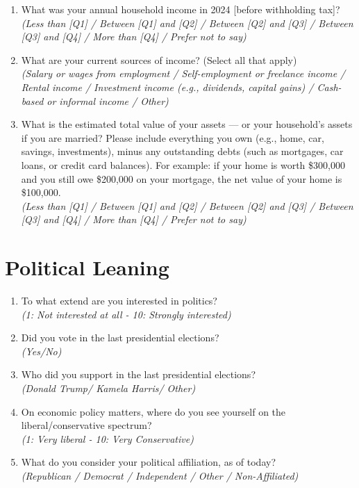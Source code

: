 \documentclass[11pt]{article}
\begin{document}
\begin{enumerate}
    \item What was your annual household income in 2024 [before withholding tax]?\\ 
    \textit{(Less than [Q1] / Between [Q1] and [Q2] / Between [Q2] and [Q3] / Between [Q3] and [Q4] / More than [Q4] / Prefer not to say)}
    \item What are your current sources of income? (Select all that apply)\\
    \textit{(Salary or wages from employment / Self-employment or freelance income / Rental income / Investment income (e.g., dividends, capital gains) / Cash-based or informal income / Other)}
    \item What is the estimated total value of your assets — or your household’s assets if you are married? Please include everything you own (e.g., home, car, savings, investments), minus any outstanding debts (such as mortgages, car loans, or credit card balances). For example: if your home is worth \$300,000 and you still owe \$200,000 on your mortgage, the net value of your home is \$100,000.\\
    \textit{(Less than [Q1] / Between [Q1] and [Q2] / Between [Q2] and [Q3] / Between [Q3] and [Q4] / More than [Q4] / Prefer not to say)}
\end{enumerate}
\section*{Political Leaning}
\begin{enumerate}[resume]
    \item To what extend are you interested in politics?\\ \textit{(1: Not interested at all - 10: Strongly interested)}
    \item Did you vote in the last presidential elections? \\\textit{(Yes/No)}
    \item Who did you support in the last presidential elections? \\ \textit{(Donald Trump/ Kamela Harris/ Other)}
    \item On economic policy matters, where do you see yourself on the liberal/conservative spectrum? \\\textit{(1: Very liberal - 10: Very Conservative)}
    \item What do you consider your political affiliation, as of today? \\
    \textit{(Republican / Democrat / Independent / Other / Non-Affiliated)}
\end{enumerate}
\end{document}
